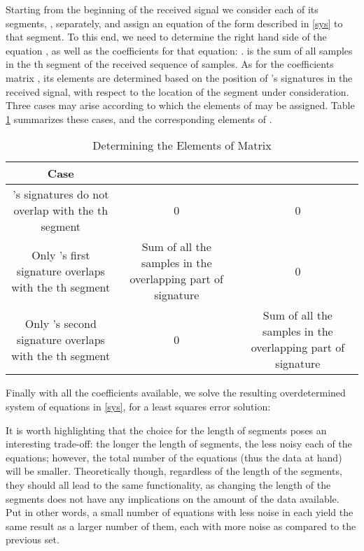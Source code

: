 \documentclass[conference]{IEEEtran}
\begin{document}
Starting from the beginning of the received signal we consider each of its segments, , separately, and assign an equation of the form described in \ref{sys} to that segment. To this end, we need to determine the right hand side of the equation , as well as the coefficients for that equation: .  is the sum of all samples in the th segment of the received sequence of samples. As for the coefficients matrix , its elements are determined based on the position of 's signatures in the received signal, with respect to the location of the segment under consideration. Three cases may arise according to which the elements of  may be assigned. Table \ref{C_elements} summarizes these cases, and the corresponding elements of .

\begin{table}[tp]
\renewcommand{\arraystretch}{1.3}
\centering

    \caption{Determining the Elements of Matrix }
    \label{C_elements}

    \begin{small}
    \begin{tabular}{|c|c|c|}
    \hline
    {\bf{Case}} & {} & {}\\           
    \hline
    \parbox[t]{25mm}{\centering 's signatures do not overlap with the th segment} & 0 & 0\\
    \hline
    \parbox[t]{25mm}{\centering Only 's first signature overlaps with the  th segment} & \parbox[t]{25mm}{\centering Sum of all the samples in the overlapping part of  signature} & 0\\

    \hline
    \parbox[t]{25mm}{\centering Only 's second signature overlaps with the  th segment} & 0 & \parbox[t]{25mm}{\centering Sum of all the samples in the overlapping part of  signature} \\
    \hline
    \end{tabular}
    \end{small} 
\end{table}
 
Finally with all the coefficients available, we solve the resulting overdetermined system of equations in \ref{sys}, for a least squares error solution:


It is worth highlighting that the choice for the length of segments poses an interesting trade-off: the longer the length of segments, the less noisy each of the equations; however, the total number of the equations (thus the data at hand) will be smaller. Theoretically though, regardless of the length of the segments, they should all lead to the same functionality, as changing the length of the segments does not have any implications on the amount of the data available. Put in other words, a small number of equations with less noise in each yield the same result as a larger number of them, each with more noise as compared to the previous set. 
\end{document}
